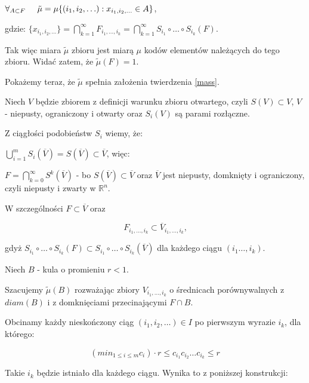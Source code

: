\documentclass{mini}
\begin{document}
\begin{dow}
$ \forall_{A \subset F} \hspace{5mm} \tilde{\mu} = \mu \lbrace (i_1,i_2, \ldots): x_{i_1,i_2, \ldots} \in A \rbrace $, 

gdzie: $\lbrace x_{i_1,i_2, \ldots} \rbrace = \bigcap^{\infty}_{k=1} F_{i_1, \ldots, i_k} = \bigcap^{\infty}_{k=1} S_{i_1}\circ\ldots\circ S_{i_k} (F)$.

Tak więc miara $\tilde{\mu}$ zbioru jest miarą $\mu$ kodów elementów należących do tego zbioru.
Widać zatem, że $\tilde{\mu}(F)=1$.

Pokażemy teraz, że $\tilde{\mu}$ spełnia założenia twierdzenia \eqref{mass}.

Niech $V$ będzie zbiorem z definicji warunku zbioru otwartego, czyli $S(V) \subset V$, $V$ - niepusty, ograniczony i otwarty oraz $S_i(V)$ są parami rozłączne.

Z ciągłości podobieństw $S_i$ wiemy, że:

$\bigcup^m_{i=1} S_i(\overline{V}) = S(\overline{V}) \subset \overline{V}$, więc:

$ F = \bigcap^{\infty}_{k=0} S^k(\overline{V}) $ - bo $S(\overline{V})\subset \overline{V}$ oraz $\overline{V}$ jest niepusty, domknięty i ograniczony, czyli niepusty i zwarty w $\mathbb{R}^n$.

W szczególności $ F \subset \overline{V} $ oraz 

\begin{equation}\label{zaw}
F_{i_1,\ldots,i_k}\subset \overline{V}_{i_1,\ldots,i_k}\textrm{,}
\end{equation}

gdyż $ S_{i_1}\circ\ldots\circ S_{i_k}(F) \subset S_{i_1}\circ\ldots\circ S_{i_k}(\overline{V}) $ dla każdego ciągu $(i_1\ldots,i_k)$.

Niech $B$ - kula o promieniu $r<1$.

Szacujemy $\tilde{\mu}(B)$ rozważając zbiory $ V_{i_1,\ldots,i_k} $ o średnicach porównywalnych z $diam(B)$ i z domknięciami przecinającymi $F \cap B$.

Obcinamy każdy nieskończony ciąg $(i_1,i_2,\ldots) \in I$ po pierwszym wyrazie $i_k$, dla którego:

\begin{equation}\label{rrr}
(min_{1 \leqslant i \leqslant m} c_i)\cdot r \leqslant c_{i_1} c_{i_2 }\ldots c_{i_k} \leqslant r
\end{equation}

Takie $i_k$ będzie istniało dla każdego ciągu. Wynika to z poniższej konstrukcji: 
 

\end{dow}
\end{document}
